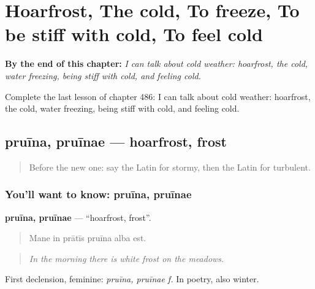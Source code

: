 
\chapter{Hoarfrost, The cold, To freeze, To be stiff with cold, To feel cold}
\label{ch:la-hoarfrost-the-cold-to-freeze-to-be-stiff-with-cold-to-feel-cold}

\begin{chapteropening}
\textbf{By the end of this chapter:} \emph{I can talk about cold weather: hoarfrost, the cold, water freezing, being stiff with cold, and feeling cold.}

Complete the last lesson of chapter 486: I can talk about cold weather: hoarfrost, the cold, water freezing, being stiff with cold, and feeling cold.
\end{chapteropening}

\section[pruīna, pruīnae]{pruīna, pruīnae — hoarfrost, frost}

\label{lesson:LA-C486-pruina}



\begin{quote}
Before the new one: say the Latin for stormy, then the Latin for turbulent.
\end{quote}

\subsection*{You'll want to know: pruīna, pruīnae}
\textbf{pruīna, pruīnae} — \textquotedblleft{}hoarfrost, frost\textquotedblright{}.

\begin{quote}
Mane in prātīs pruīna alba est.
\end{quote}

\begin{quote}
\emph{In the morning there is white frost on the meadows.}
\end{quote}

First declension, feminine: \emph{pruīna, pruīnae f.} In poetry, also winter.

